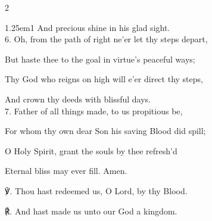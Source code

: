\begin{multicols}{2}
\begin{hangparas}{1.25em}{1}
And precious shine in his glad sight.\\

6. Oh, from the path of right ne'er let thy steps depart,

But haste thee to the goal in virtue's peaceful ways;

Thy God who reigns on high will e'er direct thy steps,

And crown thy deeds with blissful days.\\

7. Father of all things made, to us propitious be,

For whom thy own dear Son his saving Blood did spill;

O Holy Spirit, grant the souls by thee refresh'd

Eternal bliss may ever fill. Amen.\\
\end{hangparas}

℣. Thou hast redeemed us, O Lord, by thy Blood.

℟. And hast made us unto our God a kingdom.


\fussy
\end{multicols}


\mattins
{}

